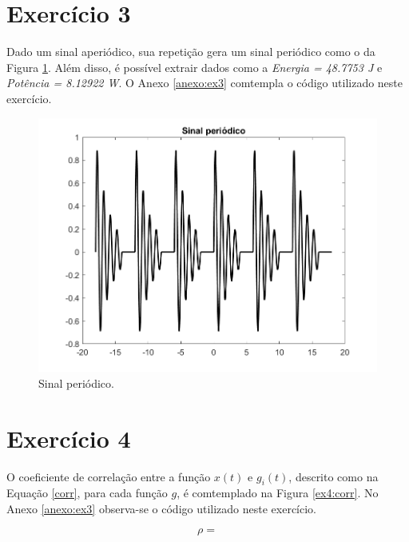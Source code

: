 \documentclass[a4paper,12pt,oneside,openany,table,xcdraw]{article}
\begin{document}
\vspace{0.3cm}
\section{Exercício 3}
Dado um sinal aperiódico, sua repetição gera um sinal periódico como o da Figura \ref{ex3:sinal}. Além disso, é possível extrair dados como a \textit{Energia = 48.7753 J} e \textit{Potência = 8.12922 W}. O Anexo \ref{anexo:ex3} comtempla o código utilizado neste exercício.

\vspace{0.4cm}
\begin{figure}[H]
\centering
\includegraphics[width=16cm]{ex3-sinal}
\caption{Sinal periódico.}
\label{ex3:sinal}
\end{figure}

\vspace{0.3cm}
\section{Exercício 4}
O coeficiente de correlação entre a função $x(t)$ e $g_i(t)$, descrito como na Equação \ref{corr}, para cada função $g$, é comtemplado na Figura \ref{ex4:corr}. No Anexo \ref{anexo:ex3} observa-se o código utilizado neste exercício.

\vspace{0.4cm}
\begin{equation}
\rho = 
\end{equation}
\end{document}
